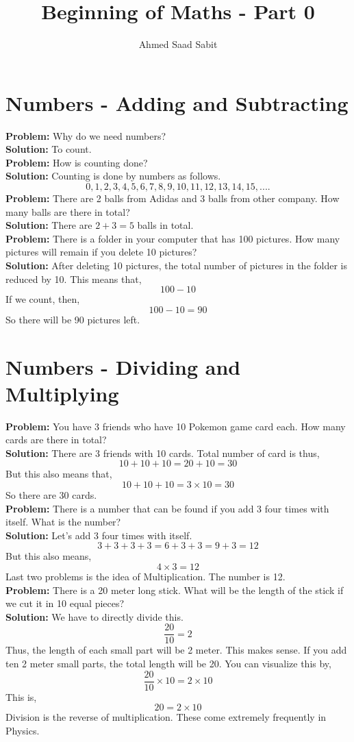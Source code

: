 \documentclass[10pt,a4paper]{article}
\title{Beginning of Maths - Part 0 }
\author{Ahmed Saad Sabit}
\begin{document}
\maketitle
\section{Numbers - Adding and Subtracting}
\textbf{Problem:} Why do we need numbers?\\
\textbf{Solution:} To count. \\
\textbf{Problem:} How is counting done?\\
\textbf{Solution:} Counting is done by numbers as follows. 
\[0, 1, 2,3,4,5,6,7,8,9,10,11,12,13,14,15,....\] 
\textbf{Problem:} There are 2 balls from Adidas and 3 balls from other company. How many balls are there in total? \\
\textbf{Solution:} There are $2+3=5$ balls in total. \\
\textbf{Problem:} There is a folder in your computer that has 100 pictures. How many pictures will remain if you delete 10 pictures? \\
\textbf{Solution:} After deleting 10 pictures, the total number of pictures in the folder is reduced by 10. This means that, 
\[ 100 - 10\]
If we count, then,
\[ 100 - 10 = 90 \]
So there will be 90 pictures left.
\section{Numbers - Dividing and Multiplying}
\textbf{Problem:} You have 3 friends who have 10 Pokemon game card each. How many cards are there in total? \\
\textbf{Solution:} There are 3 friends with 10 cards. Total number of card is thus,
\[ 10+10+10 = 20 +10 = 30 \]
But this also means that, 
\[ 10+10+10 = 3 \times 10 = 30 \]
So there are 30 cards.\\
\textbf{Problem:} There is a number that can be found if you add 3 four times with itself. What is the number?\\
\textbf{Solution:} Let's add 3 four times with itself. 
\[3 + 3 + 3 + 3 =  6 + 3+3 = 9+3=12 \]
But this also means,
\[ 4 \times 3 = 12 \]
Last two problems is the idea of Multiplication. The number is 12.\\
\textbf{Problem:} There is a 20 meter long stick. What will be the length of the stick if we cut it in 10 equal pieces?\\
\textbf{Solution:} We have to directly divide this. 
\[ \frac{20}{10} = 2 \]
Thus, the length of each small part will be 2 meter. This makes sense. If you add ten 2 meter small parts, the total length will be 20. You can visualize this by,
\[ \frac{20}{10} \times 10 = 2 \times 10 \]
This is, 
\[ 20 = 2 \times 10 \]
Division is the reverse of multiplication. These come extremely frequently in Physics.
\end{document}
